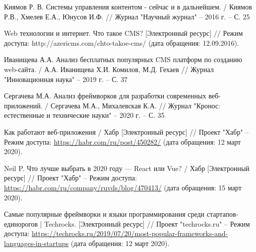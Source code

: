 \begin{thebibliography}{00}
        Киямов Р. В. Системы управления контентом - сейчас и в дальнейшем.
        /
        Киямов Р.В., Хмелев Е.А., Юнусов И.Ф.
        //
        Журнал "Научный журнал"
        --
        2016 г.
        --
        С. 25

        Web технологии и интернет. Что такое CMS? [Электронный ресурс] //
        Режим доступа:
        http://azericms.com/chto-takoe-cms/
        (дата обращения: 12.09.2016).


        Иванищева А.А. Анализ бесплатных популярных CMS платформ по созданию web-сайта.
        /
        А.А. Иванищева Х.И. Комилов, М.Д. Гехаев
        //
        Журнал "Инновационная наука"
        --
        2019 г.
        --
        С. 37

        Сергачева М.А. Анализ фреймворков для разработки современных веб-приложений.
        /
        Сергачева М.А., Михалевская К.А.
        //
        Журнал "Кронос: естественные и технические науки"
        --
        2020 г.
        --
        С. 35

        Как работают веб-приложения / Хабр
        [Электронный ресурс] //
        Проект "Хабр"
        --
        Режим доступа:
        \href{https://habr.com/ru/post/450282/}{https://habr.com/ru/post/450282/}
        (дата обращения: 12 март 2020).

        Neil P. Что лучше выбрать в 2020 году — React или Vue? / Хабр
        [Электронный ресурс] //
        Проект "Хабр"
        --
        Режим доступа:
        \href{https://habr.com/ru/company/ruvds/blog/470413/}{https://habr.com/ru/company/ruvds/blog/470413/}
        (дата обращения: 15 март 2020).

        Самые популярные фреймворки и языки программирования среди стартапов-единорогов | Techrocks.
        [Электронный ресурс] //
        Проект "techrocks.ru"
        --
        Режим доступа:
        \href{https://techrocks.ru/2019/07/20/most-popular-frameworks-and-languages-in-startups}{https://techrocks.ru/2019/07/20/most-popular-frameworks-and-languages-in-startups}
        (дата обращения: 12 март 2020).



\end{thebibliography}
